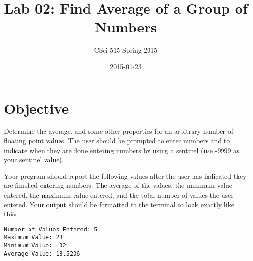 \documentclass[11pt]{article}
\title{Lab 02: Find Average of a Group of Numbers}
\author{CSci 515 Spring 2015}
\date{2015-01-23}
\begin{document}
\maketitle

\section*{Objective}
\label{sec-1}

Determine the average, and some other properties for an arbitrary
number of floating point values.  The user should be prompted to enter
numbers and to indicate when they are done entering numbers by using a
sentinel (use -9999 as your sentinel value).

Your program should report the following values after the user has
indicated they are finished entering numbers.  The average of the
values, the minimum value entered, the maximum value entered, and the
total number of values the user entered.  Your output should be formatted
to the terminal to look exactly like this:


\begin{verbatim}
Number of Values Entered: 5
Maximum Value: 28
Minimum Value: -32
Average Value: 18.5236
\end{verbatim}
\end{document}
